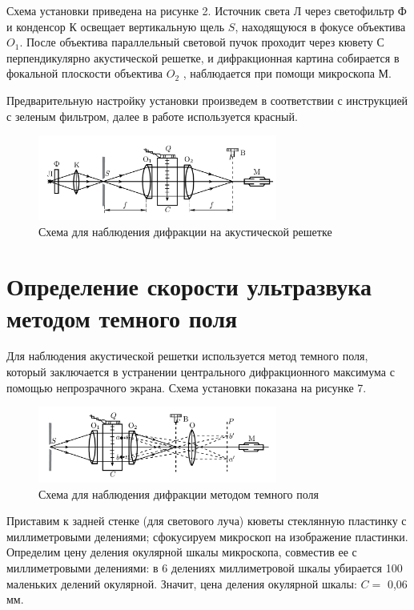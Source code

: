 \documentclass[14pt,a4paper]{article}
\begin{document}
Схема установки приведена на рисунке 2. Источник света Л через светофильтр Ф и конденсор К освещает вертикальную щель $ S $, находящуюся в фокусе объектива $ O_1 $. После объектива параллельный световой пучок проходит через кювету С перпендикулярно акустической решетке, и дифракционная картина собирается в фокальной плоскости объектива $ O_2 $ , наблюдается при помощи микроскопа М.

Предварительную настройку установки произведем в соответствии с инструкцией с зеленым фильтром, далее в работе используется красный.

	\begin{figure}[H]
	\centering
	\includegraphics[width=0.7\textwidth]{Images/shema1.png}
	\caption{Схема для наблюдения дифракции на акустической решетке}
	\label{shema1}
\end{figure}

\section*{Определение скорости ультразвука методом темного поля}

Для наблюдения акустической решетки используется метод темного поля, который заключается в устранении центрального дифракционного максимума с помощью непрозрачного экрана. Схема установки показана на рисунке 7.

	\begin{figure}[H]
	\centering
	\includegraphics[width=0.7\textwidth]{Images/shema2.png}
	\caption{Схема для наблюдения дифракции методом темного поля}
	\label{shema2}
\end{figure}

Приставим к задней стенке (для светового луча) кюветы стеклянную пластинку с миллиметровыми делениями; сфокусируем микроскоп на изображение пластинки. Определим цену деления окулярной шкалы микроскопа, совместив ее с миллиметровыми делениями: в 6 делениях миллиметровой шкалы убирается 100 маленьких делений окулярной. Значит, цена деления окулярной шкалы: $ C = $ 0,06 мм.
\end{document}
